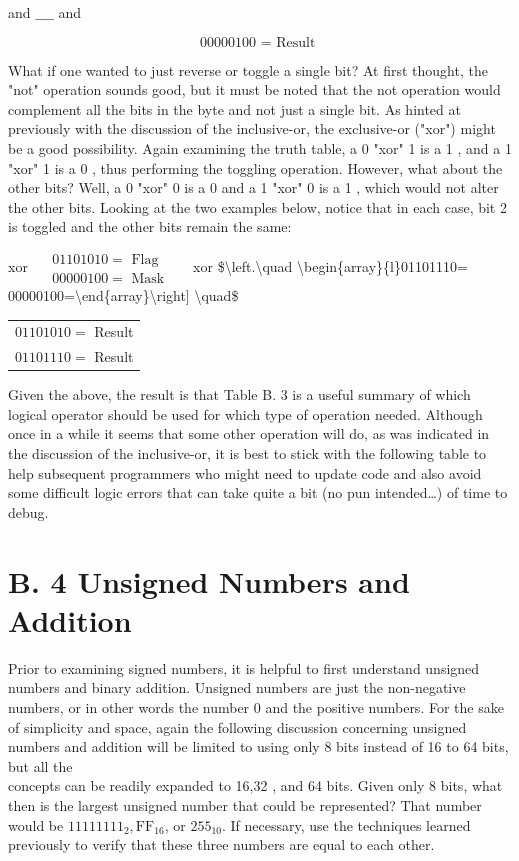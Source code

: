\documentclass[10pt]{article}
\begin{document}
and $\_\_\_\_$ and

$$
00000100 \text { = Result }
$$

What if one wanted to just reverse or toggle a single bit? At first thought, the "not" operation sounds good, but it must be noted that the not operation would complement all the bits in the byte and not just a single bit. As hinted at previously with the discussion of the inclusive-or, the exclusive-or ("xor") might be a good possibility. Again examining the truth table, a 0 "xor" 1 is a 1 , and a 1 "xor" 1 is a 0 , thus performing the toggling operation. However, what about the other bits? Well, a 0 "xor" 0 is a 0 and a 1 "xor" 0 is a 1 , which would not alter the other bits. Looking at the two examples below, notice that in each case, bit 2 is toggled and the other bits remain the same:

xor $\quad \begin{array}{l}01101010=\text { Flag } \\
00000100=\text { Mask }\end{array} \quad$ xor \$\textbackslash left.\textbackslash quad \textbackslash begin\{array\}\{l\}01101110= \\


00000100=\textbackslash end\{array\}\textbackslash right] \textbackslash quad\$\begin{tabular}{c}
$01101010=$ Result \\
$01101110=$ Result \\
\end{tabular}

Given the above, the result is that Table B. 3 is a useful summary of which logical operator should be used for which type of operation needed. Although once in a while it seems that some other operation will do, as was indicated in the discussion of the inclusive-or, it is best to stick with the following table to help subsequent programmers who might need to update code and also avoid some difficult logic errors that can take quite a bit (no pun intended…) of time to debug.

\section*{B. 4 Unsigned Numbers and Addition}
Prior to examining signed numbers, it is helpful to first understand unsigned numbers and binary addition. Unsigned numbers are just the non-negative numbers, or in other words the number 0 and the positive numbers. For the sake of simplicity and space, again the following discussion concerning unsigned numbers and addition will be limited to using only 8 bits instead of 16 to 64 bits, but all the\\
concepts can be readily expanded to 16,32 , and 64 bits. Given only 8 bits, what then is the largest unsigned number that could be represented? That number would be $11111111_{2}, \mathrm{FF}_{16}$, or $255_{10}$. If necessary, use the techniques learned previously to verify that these three numbers are equal to each other.
\end{document}
